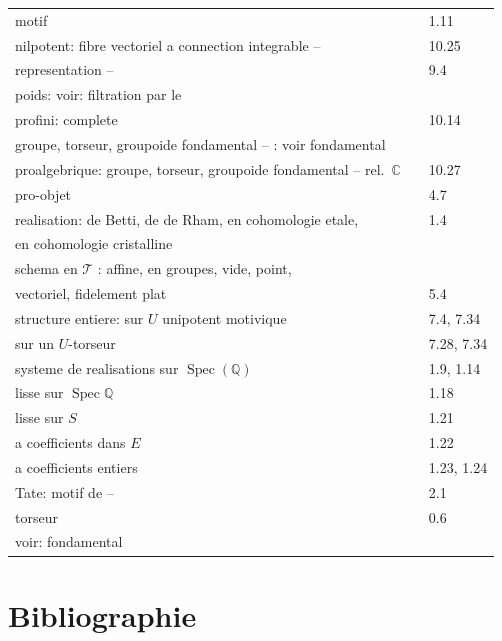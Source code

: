 \documentclass[12pt,a4paper]{article}
\theoremstyle{plain}
\theoremstyle{definition}
\theoremstyle{remark}
\DeclareMathOperator{\Spec}{Spec}
\newcommand{\QQ}{\mathbb{Q}}
\newcommand{\CC}{\mathbb{C}}
\begin{document}
\begin{tabular}{lll}
motif & & 1.11 \\
nilpotent: fibre vectoriel a connection integrable -- & & 10.25 \\
\quad representation -- & & 9.4 \\
poids: voir: filtration par le & & \\
profini: complete & & 10.14 \\
groupe, torseur, groupoide fondamental -- : voir fondamental & & \\
proalgebrique: groupe, torseur, groupoide fondamental -- rel.\ $\CC$ & & 10.27 \\
pro-objet & & 4.7 \\
realisation: de Betti, de de Rham, en cohomologie etale, & & 1.4 \\
\quad en cohomologie cristalline & & \\
schema en $\mathcal{T}$ : affine, en groupes, vide, point, & & \\
\quad vectoriel, fidelement plat & & 5.4 \\
structure entiere: sur $U$ unipotent motivique & & 7.4, 7.34 \\
\quad sur un $U$-torseur & & 7.28, 7.34 \\
systeme de realisations sur $\Spec(\QQ)$ & & 1.9, 1.14 \\
\quad lisse sur $\Spec \QQ$ & & 1.18 \\
\quad lisse sur $S$ & & 1.21 \\
\quad a coefficients dans $E$ & & 1.22 \\
\quad a coefficients entiers & & 1.23, 1.24 \\
Tate: motif de -- & & 2.1 \\
torseur & & 0.6 \\
\quad voir: fondamental & & \\
\end{tabular}

\newpage
\section*{Bibliographie}
\end{document}
